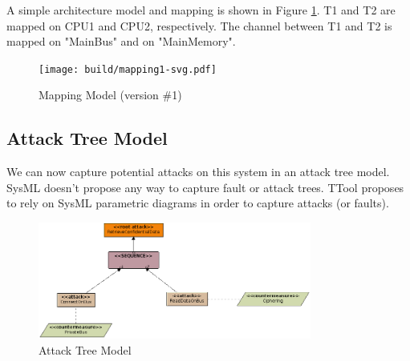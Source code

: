 \documentclass[12pt]{article}
\begin{document}
A simple architecture model and mapping is shown in Figure \ref{fig:mapping1}. T1 and T2 are mapped on CPU1 and CPU2, respectively. The channel between T1 and T2 is mapped on "MainBus" and on "MainMemory".

\begin{figure}[htbp]
\centering
\texttt{[image: build/mapping1-svg.pdf]}
\caption{Mapping Model (version \#1)} \label{fig:mapping1}
\end{figure}

\subsection{Attack Tree Model}
We can now capture potential attacks on this system in an attack tree model. SysML doesn't propose any way to capture fault or attack trees. TTool proposes to rely on SysML parametric diagrams in order to capture attacks (or faults).

\begin{figure}[htbp]
\centering
\includegraphics[width=0.8\textwidth]{fig/attacktree.png}
\caption{Attack Tree Model} \label{fig:attacktree}
\end{figure}
\end{document}
